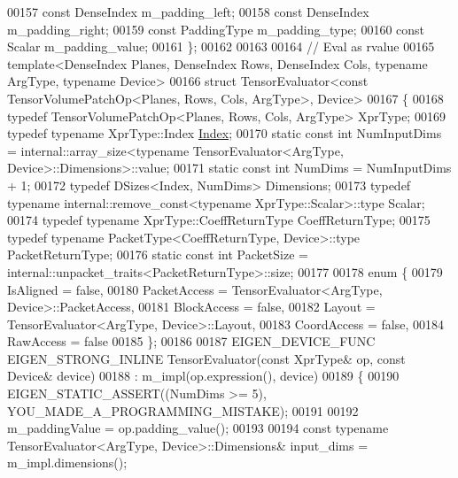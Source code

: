 \begin{DoxyCode}
00157     \textcolor{keyword}{const} DenseIndex m\_padding\_left;
00158     \textcolor{keyword}{const} DenseIndex m\_padding\_right;
00159     \textcolor{keyword}{const} PaddingType m\_padding\_type;
00160     \textcolor{keyword}{const} Scalar m\_padding\_value;
00161 \};
00162 
00163 
00164 \textcolor{comment}{// Eval as rvalue}
00165 \textcolor{keyword}{template}<DenseIndex Planes, DenseIndex Rows, DenseIndex Cols, \textcolor{keyword}{typename} ArgType, \textcolor{keyword}{typename} Device>
00166 \textcolor{keyword}{struct }TensorEvaluator<const TensorVolumePatchOp<Planes, Rows, Cols, ArgType>, Device>
00167 \{
00168   \textcolor{keyword}{typedef} TensorVolumePatchOp<Planes, Rows, Cols, ArgType> XprType;
00169   \textcolor{keyword}{typedef} \textcolor{keyword}{typename} XprType::Index \hyperlink{namespace_eigen_a62e77e0933482dafde8fe197d9a2cfde}{Index};
00170   \textcolor{keyword}{static} \textcolor{keyword}{const} \textcolor{keywordtype}{int} NumInputDims = internal::array\_size<typename TensorEvaluator<ArgType,
       Device>::Dimensions>::value;
00171   \textcolor{keyword}{static} \textcolor{keyword}{const} \textcolor{keywordtype}{int} NumDims = NumInputDims + 1;
00172   \textcolor{keyword}{typedef} DSizes<Index, NumDims> Dimensions;
00173   \textcolor{keyword}{typedef} \textcolor{keyword}{typename} internal::remove\_const<typename XprType::Scalar>::type Scalar;
00174   \textcolor{keyword}{typedef} \textcolor{keyword}{typename} XprType::CoeffReturnType CoeffReturnType;
00175   \textcolor{keyword}{typedef} \textcolor{keyword}{typename} PacketType<CoeffReturnType, Device>::type PacketReturnType;
00176   \textcolor{keyword}{static} \textcolor{keyword}{const} \textcolor{keywordtype}{int} PacketSize = internal::unpacket\_traits<PacketReturnType>::size;
00177 
00178   \textcolor{keyword}{enum} \{
00179     IsAligned = \textcolor{keyword}{false},
00180     PacketAccess = TensorEvaluator<ArgType, Device>::PacketAccess,
00181     BlockAccess = \textcolor{keyword}{false},
00182     Layout = TensorEvaluator<ArgType, Device>::Layout,
00183     CoordAccess = \textcolor{keyword}{false},
00184     RawAccess = \textcolor{keyword}{false}
00185   \};
00186 
00187   EIGEN\_DEVICE\_FUNC EIGEN\_STRONG\_INLINE TensorEvaluator(\textcolor{keyword}{const} XprType& op, \textcolor{keyword}{const} Device& device)
00188       : m\_impl(op.expression(), device)
00189   \{
00190     EIGEN\_STATIC\_ASSERT((NumDims >= 5), YOU\_MADE\_A\_PROGRAMMING\_MISTAKE);
00191 
00192     m\_paddingValue = op.padding\_value();
00193 
00194     \textcolor{keyword}{const} \textcolor{keyword}{typename} TensorEvaluator<ArgType, Device>::Dimensions& input\_dims = m\_impl.dimensions();

\end{DoxyCode}
